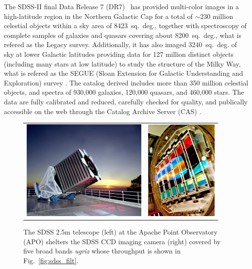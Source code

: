 The SDSS-II final Data Release 7 (DR7)~\citep{Abazajian2009} has provided multi-color images in a high-latitude region in the Northern Galactic Cap for a total of $\sim$230 million celestial objects within a sky area of 8423~sq.~deg., together with spectroscopy of complete samples of galaxies and quasars covering about 8200~sq.~deg., what is refered as the Legacy survey. Additionally, it has also imaged 3240~sq.~deg. of sky at lower Galactic latitudes providing data for 127 million distinct objects (including many stars at low latitude) to study the structure of the Milky Way, what is refered as the SEGUE (Sloan Extension for Galactic Understanding and Exploration) survey \citep{Yanny2009}. The catalog derived includes more than 350 million celestial objects, and spectra of 930,000 galaxies, 120,000 quasars, and 460,000 stars. The data are fully calibrated and reduced, carefully checked for quality, and publically accessible on the web through the Catalog Archive Server (CAS) \citep{Thakar2008}. 
\begin{figure}
\centering
\begin{tabular}{rl}
\includegraphics[height=50mm]{./plots/sdss_telescope.jpg} & \includegraphics[height=50mm]{./plots/sdss_camera.jpg}
\end{tabular}
\caption{The SDSS 2.5m telescope (left) at the Apache Point Observatory (APO) shelters the SDSS CCD imaging camera (right) covered by five broad bands \textit{ugriz} whose throughput is shown in Fig.~\ref{fig:sdss_filt}.}
\label{fig:sdss_survey}
\end{figure}

